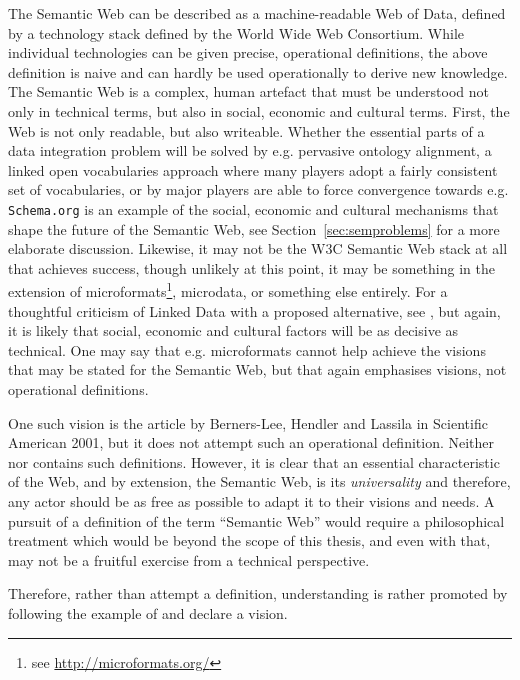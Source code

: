 The Semantic Web can be described as a machine-readable Web of Data,
defined by a technology stack defined by the World Wide Web
Consortium. While individual technologies can be given precise,
operational definitions, the above definition is naive and can hardly
be used operationally to derive new knowledge. The Semantic Web is a
complex, human artefact that must be understood not only in technical
terms, but also in social, economic and cultural terms. First, the Web
is not only readable, but also writeable. Whether the essential parts
of a data integration problem will be solved by e.g. pervasive
ontology alignment, a linked open vocabularies approach where many
players adopt a fairly consistent set of vocabularies, or by major
players are able to force convergence towards e.g. \texttt{Schema.org}
is an example of the social, economic and cultural mechanisms that
shape the future of the Semantic Web, see
Section~\ref{sec:semproblems} for a more elaborate
discussion. Likewise, it may not be the W3C Semantic Web stack at all
that achieves success, though unlikely at this point, it may be
something in the extension of microformats\footnote{see
  \url{http://microformats.org/}}, microdata\cite{microdata}, or
something else entirely. For a thoughtful criticism of Linked Data
with a proposed alternative, see \cite{darobin1}, but again, it is
likely that social, economic and cultural factors will be as decisive
as technical. One may say that e.g. microformats cannot help achieve
the visions that may be stated for the Semantic Web, but that again
emphasises visions, not operational definitions.

One such vision is the article by Berners-Lee, Hendler and Lassila in
Scientific American 2001\cite{berners2001semantic}, but it does not attempt such an
operational definition. Neither \cite{semwebroadmap} nor \cite{berners2000weaving} contains
such definitions. However, it is clear that an essential
characteristic of the Web, and by extension, the Semantic Web, is its
\emph{universality} and therefore, any actor should be as free as
possible to adapt it to their visions and needs. A pursuit of a
definition of the term ``Semantic Web'' would require a philosophical
treatment which would be beyond the scope of this thesis, and even
with that, may not be a fruitful exercise from a technical
perspective. 

Therefore, rather than attempt a definition, understanding is rather
promoted by following the example of \cite{berners2001semantic} and
declare a vision.



